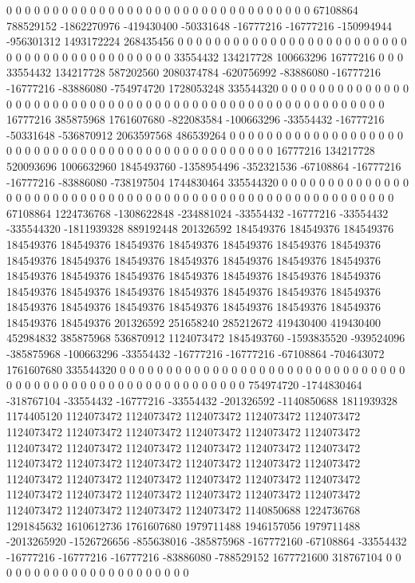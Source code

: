 0 0 0 0 0 0 0 0 0 0 0 0 0 0 0 0 0 0 0 0 0 0 0 0 0 0 0 0 0 0 0 0 0 67108864 788529152 -1862270976 -419430400 -50331648 -16777216 -16777216 -150994944 -956301312 1493172224 268435456 0 0 0 0 0 0 0 0 0 0 0 0 0 0 0 0 0 0 0 0 0 0 0 0 0 0 0 0 0 0 0 0 0 0 0 0 0 0 0 0 0 0 0 33554432 134217728 100663296 16777216 0 0 0 33554432 134217728 587202560 2080374784 -620756992 -83886080 -16777216 -16777216 -83886080 -754974720 1728053248 335544320 0 0 0 0 0 0 0 0 0 0 0 0 0 0 0 0 0 0 0 0 0 0
0 0 0 0 0 0 0 0 0 0 0 0 0 0 0 0 0 0 0 0 0 0 0 0 0 0 0 0 0 0 0 0 0 16777216 385875968 1761607680 -822083584 -100663296 -33554432 -16777216 -50331648 -536870912 2063597568 486539264 0 0 0 0 0 0 0 0 0 0 0 0 0 0 0 0 0 0 0 0 0 0 0 0 0 0 0 0 0 0 0 0 0 0 0 0 0 0 0 0 0 0 0 0 0 0 0 0 16777216 134217728 520093696 1006632960 1845493760 -1358954496 -352321536 -67108864 -16777216 -16777216 -83886080 -738197504 1744830464 335544320 0 0 0 0 0 0 0 0 0 0 0 0 0 0 0 0 0 0 0 0 0 0
0 0 0 0 0 0 0 0 0 0 0 0 0 0 0 0 0 0 0 0 0 0 0 0 0 0 0 0 0 0 0 0 0 0 67108864 1224736768 -1308622848 -234881024 -33554432 -16777216 -33554432 -335544320 -1811939328 889192448 201326592 184549376 184549376 184549376 184549376 184549376 184549376 184549376 184549376 184549376 184549376 184549376 184549376 184549376 184549376 184549376 184549376 184549376 184549376 184549376 184549376 184549376 184549376 184549376 184549376 184549376 184549376 184549376 184549376 184549376 184549376 184549376 184549376 184549376 184549376 184549376 184549376 184549376 184549376 184549376 184549376 201326592 251658240 285212672 419430400 419430400 452984832 385875968 536870912 1124073472 1845493760 -1593835520 -939524096 -385875968 -100663296 -33554432 -16777216 -16777216 -67108864 -704643072 1761607680 335544320 0 0 0 0 0 0 0 0 0 0 0 0 0 0 0 0 0 0 0 0 0 0
0 0 0 0 0 0 0 0 0 0 0 0 0 0 0 0 0 0 0 0 0 0 0 0 0 0 0 0 0 0 0 0 0 0 0 754974720 -1744830464 -318767104 -33554432 -16777216 -33554432 -201326592 -1140850688 1811939328 1174405120 1124073472 1124073472 1124073472 1124073472 1124073472 1124073472 1124073472 1124073472 1124073472 1124073472 1124073472 1124073472 1124073472 1124073472 1124073472 1124073472 1124073472 1124073472 1124073472 1124073472 1124073472 1124073472 1124073472 1124073472 1124073472 1124073472 1124073472 1124073472 1124073472 1124073472 1124073472 1124073472 1124073472 1124073472 1124073472 1124073472 1124073472 1124073472 1124073472 1140850688 1224736768 1291845632 1610612736 1761607680 1979711488 1946157056 1979711488 -2013265920 -1526726656 -855638016 -385875968 -167772160 -67108864 -33554432 -16777216 -16777216 -16777216 -83886080 -788529152 1677721600 318767104 0 0 0 0 0 0 0 0 0 0 0 0 0 0 0 0 0 0 0 0 0 0
